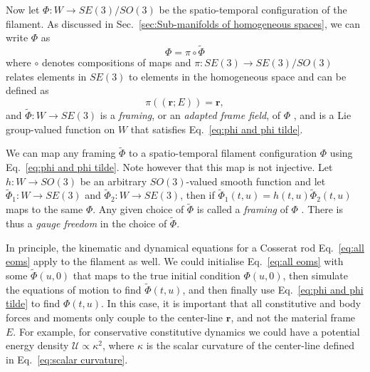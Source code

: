 Now let $\Phi : W \to SE(3)/SO(3)$ be the spatio-temporal configuration of the filament. As discussed in Sec.~\ref{sec:Sub-manifolds of homogeneous spaces}, we can write $\Phi$ as
\begin{equation} \label{eq:phi and phi tilde}
\Phi = \pi \circ \tilde{\Phi}
\end{equation}
where $\circ$ denotes compositions of maps and $\pi : SE(3) \to SE(3)/SO(3)$ relates elements in $SE(3)$ to elements in the homogeneous space and can be defined as
\begin{equation}
\pi( (\mathbf{r} ; E) ) = \mathbf{r},
\end{equation}
and $\tilde{\Phi} : W \to SE(3)$ is a \textit{framing}, or an \textit{adapted frame field}, of $\Phi$ \citep{clellandFrenetCartanMethod2017}, and is a Lie group-valued function on $W$ that satisfies Eq.~\ref{eq:phi and phi tilde}.

We can map any framing $\tilde{\Phi}$ to a spatio-temporal filament configuration $\Phi$ using Eq.~\ref{eq:phi and phi tilde}. Note however that this map is not injective. Let $h : W \to SO(3)$ be an arbitrary $SO(3)$-valued smooth function and let $\tilde{\Phi}_1 : W \to SE(3)$ and $\tilde{\Phi}_2 : W \to SE(3)$, then if $\tilde{\Phi}_1(t,u) = h(t,u) \tilde{\Phi}_2(t,u)$ maps to the same $\Phi$. Any given choice of $\tilde{\Phi}$ is called a \textit{framing} of $\Phi$ \citep{clellandFrenetCartanMethod2017}. There is thus a \textit{gauge freedom} in the choice of $\tilde{\Phi}$.

In principle, the kinematic and dynamical equations for a Cosserat rod Eq.~\ref{eq:all eoms} apply to the filament as well. We could initialise Eq.~\ref{eq:all eoms} with some $\tilde{\Phi}(u, 0)$ that maps to the true initial condition $\Phi(u, 0)$, then simulate the equations of motion to find $\tilde{\Phi}(t,u)$, and then finally use Eq.~\ref{eq:phi and phi tilde} to find $\Phi(t, u)$. In this case, it is important that all constitutive and body forces and moments only couple to the center-line $\mathbf{r}$, and not the material frame $E$. For example, for conservative constitutive dynamics we could have a potential energy density $\mathcal{U} \propto \kappa^2$, where $\kappa$ is the scalar curvature of the center-line defined in Eq.~\ref{eq:scalar curvature}.

